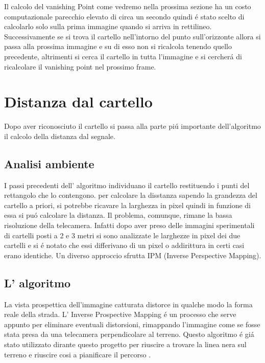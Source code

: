 		Il calcolo del vanishing Point come vedremo nella prossima sezione ha un costo computazionale parecchio elevato di circa un secondo quindi \'e stato scelto di calcolarlo solo sulla prima immagine quando si arriva in rettilineo. Successivamente se si trova il cartello nell'intorno del punto sull'orizzonte allora si passa alla prossima immagine e su di esso non si ricalcola tenendo quello precedente, altrimenti si cerca il cartello in tutta l'immagine e si cercher\'a di ricalcolare il vanishing point nel prossimo frame.

\section{Distanza dal cartello}
	
	Dopo aver riconosciuto il cartello si passa alla parte pi\'u importante dell'algoritmo il calcolo della distanza dal segnale.

	\subsection{Analisi ambiente}

		I passi precedenti dell' algoritmo individuano il cartello restituendo i punti del rettangolo che lo contengono. per calcolare la disstanza sapendo la grandezza del cartello a priori, si potrebbe ricavare la larghezza in pixel quindi in funzione di essa si pu\'o calcolare la distanza. Il problema, comunque, rimane la bassa risoluzione della telecamera. Infatti dopo aver preso delle immagini sperimentali di cartelli posti a 2 e 3 metri si sono analizzate le larghezze in pixel dei due cartelli e si \'e notato che essi differivano di un pixel o addirittura in certi casi erano identiche. Un diverso approccio sfrutta IPM (Inverse Perspective Mapping).
		
	\subsection{L' algoritmo}

		La vista prospettica dell'immagine catturata distorce in qualche modo la forma reale della strada. L' Inverse Prospective Mapping \'e un processo che serve appunto per eliminare eventuali distorsioni, rimappando l'immagine come se fosse stata presa da una telecamera perpendicolare al terreno. Questo algoritmo \'e gi\'a stato utilizzato dirante questo progetto per riuscire a trovare la linea nera sul terreno e riuscire cosi a pianificare il percorso \cite{Rettifica}.


